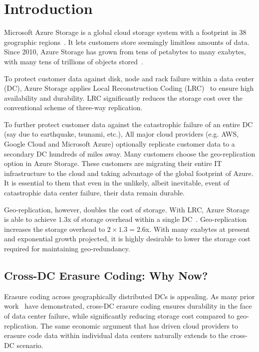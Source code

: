 \section{Introduction}

Microsoft Azure Storage is a global cloud storage system with a footprint in 38 geographic regions~\cite{bib:azureregions}. It lets customers store seemingly limitless amounts of data. Since 2010, Azure Storage has grown from tens of petabytes to many exabytes, with many tens of trillions of objects stored~\cite{greenberg2015sdn}.


To protect customer data against disk, node and rack failure within a data center (DC), Azure Storage applies Local Reconstruction Coding (LRC)~\cite{huang2012erasure} to ensure high availability and durability. LRC significantly reduces the storage cost over the conventional scheme of three-way replication. %


To further protect customer data against the catastrophic failure of an entire DC (say due to earthquake, tsunami, etc.), All major cloud providers (e.g. AWS, Google Cloud and Microsoft Azure) optionally replicate customer data to a secondary DC hundreds of miles away. Many customers choose the geo-replication option in Azure Storage. These customers are migrating their entire IT infrastructure to the cloud and taking advantage of the global footprint of Azure. It is essential to them that even in the unlikely, albeit inevitable, event of catastrophic data center failure, their data remain durable.

Geo-replication, however, doubles the cost of storage. With LRC, Azure Storage is able to achieve $1.3$x of storage overhead within a single DC~\cite{huang2012erasure}. Geo-replication increases the storage overhead to $2 \times 1.3 = 2.6$x. With many exabytes at present and exponential growth projected, it is highly desirable to lower the storage cost required for maintaining geo-redundancy.

\subsection{Cross-DC Erasure Coding: Why Now?}

Erasure coding across geographically distributed DCs is appealing. As many prior work~\cite{oceanstore:asplos00, pond:fast03, weatherspoon2005long, hail:ccs09, racs:socc10, hu12nccloud} have demonstrated, cross-DC erasure coding ensures durability in the face of data center failure, while significantly reducing storage cost compared to geo-replication. The same economic argument that has driven cloud providers to erasure code data within individual data centers naturally extends to the cross-DC scenario.

